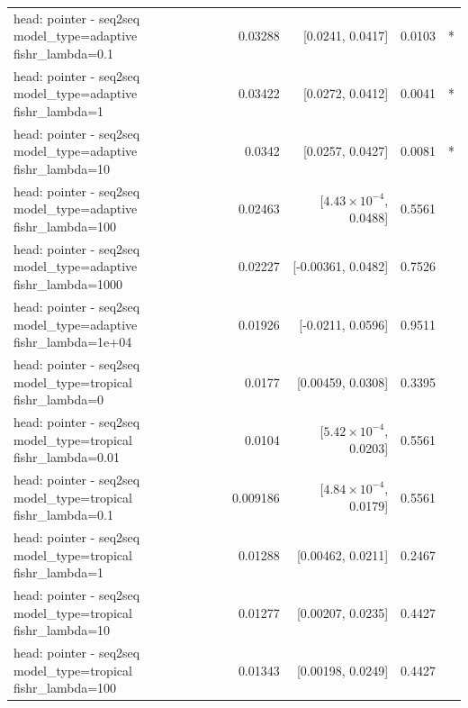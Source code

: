 \documentclass[10pt]{article}
\makeatletter
\newcommand{\stackcell}[1]{\begin{tabular}[t]{@{}l@{}}#1\end{tabular}}
\makeatother
\begin{document}
{\begin{longtable}{lrrrl}
\stackcell{head: pointer - seq2seq\\\footnotesize model\_type=adaptive fishr\_lambda=0.1 } & 0.03288 & [0.0241, 0.0417] & 0.0103 & *\\
\stackcell{head: pointer - seq2seq\\\footnotesize model\_type=adaptive fishr\_lambda=1 } & 0.03422 & [0.0272, 0.0412] & 0.0041 & *\\
\stackcell{head: pointer - seq2seq\\\footnotesize model\_type=adaptive fishr\_lambda=10 } & 0.0342 & [0.0257, 0.0427] & 0.0081 & *\\
\stackcell{head: pointer - seq2seq\\\footnotesize model\_type=adaptive fishr\_lambda=100 } & 0.02463 & [$4.43\times10^{-4}$, 0.0488] & 0.5561 & \\
\stackcell{head: pointer - seq2seq\\\footnotesize model\_type=adaptive fishr\_lambda=1000 } & 0.02227 & [-0.00361, 0.0482] & 0.7526 & \\
\stackcell{head: pointer - seq2seq\\\footnotesize model\_type=adaptive fishr\_lambda=1e+04 } & 0.01926 & [-0.0211, 0.0596] & 0.9511 & \\
\stackcell{head: pointer - seq2seq\\\footnotesize model\_type=tropical fishr\_lambda=0 } & 0.0177 & [0.00459, 0.0308] & 0.3395 & \\
\stackcell{head: pointer - seq2seq\\\footnotesize model\_type=tropical fishr\_lambda=0.01 } & 0.0104 & [$5.42\times10^{-4}$, 0.0203] & 0.5561 & \\
\stackcell{head: pointer - seq2seq\\\footnotesize model\_type=tropical fishr\_lambda=0.1 } & 0.009186 & [$4.84\times10^{-4}$, 0.0179] & 0.5561 & \\
\stackcell{head: pointer - seq2seq\\\footnotesize model\_type=tropical fishr\_lambda=1 } & 0.01288 & [0.00462, 0.0211] & 0.2467 & \\
\stackcell{head: pointer - seq2seq\\\footnotesize model\_type=tropical fishr\_lambda=10 } & 0.01277 & [0.00207, 0.0235] & 0.4427 & \\
\stackcell{head: pointer - seq2seq\\\footnotesize model\_type=tropical fishr\_lambda=100 } & 0.01343 & [0.00198, 0.0249] & 0.4427 & \\

\end{longtable}}
\end{document}
